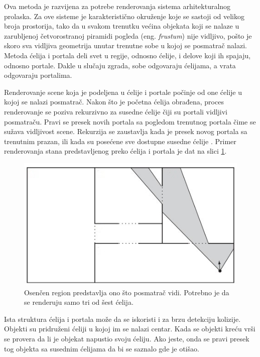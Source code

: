 \documentclass[12pt,oneside]{memoir}
\begin{document}
Ova metoda je razvijena za potrebe renderovanja sistema arhitekturalnog prolaska. 
Za ove sisteme je karakteristično okruženje koje se sastoji od velikog broja prostorija, tako da u svakom trenutku
većina objekata koji se nalaze u zarubljenoj četvorostranoj piramidi pogleda (eng. {\em frustum})
nije vidljivo, pošto je skoro sva vidljiva geometrija unutar trenutne sobe u kojoj se posmatrač nalazi.
Metoda ćelija i portala deli svet u regije, odnosno ćelije, i delove koji ih spajaju, odnosno portale.
Dakle u slučaju zgrada, sobe odgovaraju ćelijama, a vrata odgovaraju portalima. 

Renderovanje scene koja je podeljena u ćelije i portale počinje od one ćelije u kojoj se nalazi posmatrač. 
Nakon što je početna ćelija obrađena, proces renderovanje se poziva rekurzivno
za susedne ćelije čiji su portali vidljivi posmatraču. 
Pravi se presek novih portala sa pogledom trenutnog portala čime se sužava vidljivost scene.
Rekurzija se zaustavlja kada je presek novog portala sa trenutnim prazan, ili kada su posećene sve dostupne susedne ćelije \cite{glavnaKnjiga}.
Primer renderovanja stana predstavljenog preko ćelija i portala je dat na slici \ref{fig:cellsRooms}.

\begin{figure}[h!]
	\begin{center}
	\includegraphics[scale=1]{cellsRooms.jpg}
	\end{center}
	\caption{
	Osenčen region predstavlja ono što posmatrač vidi. 
	Potrebno je da se renderuju samo tri od šest ćelija. }
	\label{fig:cellsRooms}
\end{figure}

Ista struktura ćelija i portala može da se iskoristi i za brzu detekciju kolizije. 
Objekti su pridruženi ćeliji u kojoj im se nalazi centar. Kada se objekti kreću vrši 
se provera da li je objekat napustio svoju ćeliju. Ako jeste, onda se pravi presek tog objekta
sa susednim ćelijama da bi se saznalo gde je otišao. 
\end{document}
